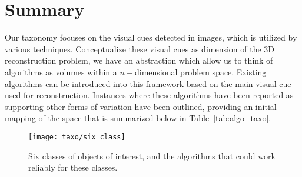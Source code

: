 \section{Summary}
Our taxonomy focuses on the visual cues detected in images, which is utilized by various techniques. Conceptualize these visual cues as dimension of the 3D reconstruction problem, we have an abstraction which allow us to think of algorithms as volumes within a $n-$dimensional problem space. Existing algorithms can be introduced into this framework based on the main visual cue used for reconstruction. Instances where these algorithms have been reported as supporting other forms of variation have been outlined, providing an initial mapping of the space that is summarized below in Table~\ref{tab:algo_taxo}.
\begin{figure*}[!htbp]
\centering
\texttt{[image: taxo/six\_class]}
\caption{Six classes of objects of interest, and the algorithms that could work reliably for these classes.}
\label{fig:six_class}
\end{figure*}

